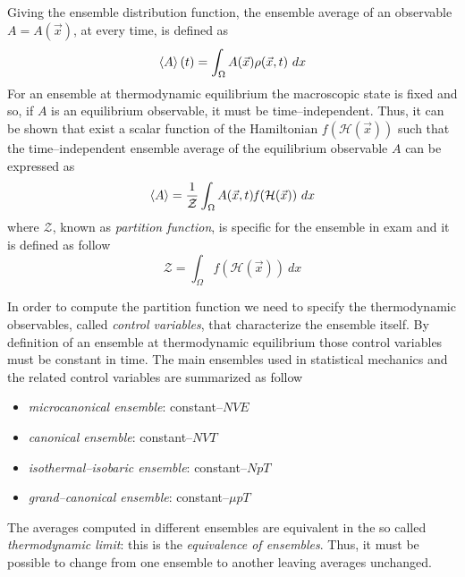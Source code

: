 Giving the ensemble distribution function, the ensemble average of an observable $A=A(\vec x)$, at every time, is 
defined as
\begin{equation*}
	\left \langle A \right \rangle(t) = \int_\Omega A(\vec x)\rho(\vec x, t)\ dx
\end{equation*}
For an ensemble at thermodynamic equilibrium the macroscopic state is fixed and so, if $A$ is an equilibrium 
observable, it must be time--independent. Thus, it can be shown \cite{Tuckerman} that exist a scalar function of 
the Hamiltonian $\mathit{f}(\mathcal{H}(\vec x))$ such that the time--independent ensemble average of the 
equilibrium observable $A$ can be expressed as 
\begin{equation*}
	\left \langle A \right \rangle = \frac{1}{\mathcal{Z}} \int_\Omega A(\vec x, t) \mathit{f}(\mathcal{H}(\vec x))\ dx
\end{equation*}
where $\mathcal{Z}$, known as \textit{partition function}, is specific for the ensemble in exam and it is defined 
as follow
\begin{equation*}
	\mathcal{Z} = \int_\Omega \mathit{f}(\mathcal{H}(\vec x))\ dx
\end{equation*}

In order to compute the partition function we need to specify the thermodynamic observables, called 
\textit{control variables}, that characterize the ensemble itself. By definition of an ensemble at thermodynamic 
equilibrium those control variables must be constant in time. The main ensembles used in statistical mechanics 
and the related control variables are summarized as follow
\begin{itemize}
	\item \textit{microcanonical ensemble}: constant--$NVE$
	\item \textit{canonical ensemble}: constant--$NVT$
	\item \textit{isothermal--isobaric ensemble}: constant--$NpT$
	\item \textit{grand--canonical ensemble}: constant--$\mu pT$
\end{itemize}
The averages computed in different ensembles are equivalent in the so called \textit{thermodynamic limit}: this 
is the \textit{equivalence of ensembles}. Thus, it must be possible to change from one ensemble to another 
leaving averages unchanged.

